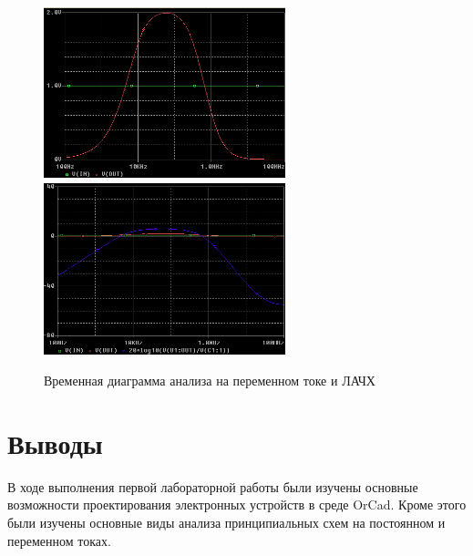 \documentclass[utf8x, 12pt]{G7-32}
\begin{document}
\begin{figure}[h]
	\begin{center}
		\includegraphics[width=7cm, height=5cm]{img/waveform_3_0}
		\includegraphics[width=7cm, height=5cm]{img/waveform_3_1}
	\end{center}
	\vspace{-5mm}\caption{Временная диаграмма анализа на переменном токе и ЛАЧХ}
\end{figure}	





\chapter{Выводы}
В ходе выполнения первой лабораторной работы были изучены основные возможности проектирования электронных устройств в среде OrCad. Кроме этого были изучены основные виды анализа принципиальных схем на постоянном и переменном токах.
\end{document}
